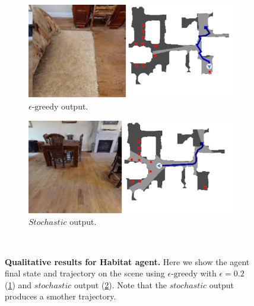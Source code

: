 \begin{figure}
    \centering
    \begin{subfigure}[b]{0.4\textwidth}
        \centering
        \includegraphics[width=\textwidth]{figures/understanding_vsn/qualitative_results/habitat_epsilon}
        \caption{$\epsilon\text{-greedy}$ output.}
        \label{fig:habitat_qualitative_epsilon}
    \end{subfigure}
    \hfill
    \begin{subfigure}[b]{0.4\textwidth}
        \centering
        \includegraphics[width=\textwidth]{figures/understanding_vsn/qualitative_results/habitat_stochastic}
        \caption{$Stochastic$ output.}
        \label{fig:habitat_qualitative_stochastic}
    \end{subfigure}~\caption{\textbf{Qualitative results for Habitat agent.} Here we show the agent final state and trajectory on the scene using $\epsilon\text{-greedy}$ with $\epsilon = 0.2$ (\ref{fig:habitat_qualitative_epsilon}) and $stochastic$ output (\ref{fig:habitat_qualitative_stochastic}). Note that the $stochastic$ output produces a smother trajectory.}
    \label{fig:habitat_qualitative}
\end{figure}

